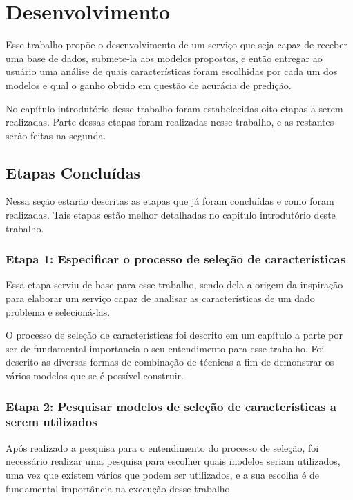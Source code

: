 \chapter[Desenvolvimento]{Desenvolvimento}

Esse trabalho propõe o desenvolvimento de um serviço que seja capaz de receber uma base de dados, submete-la aos modelos propostos, e então entregar ao usuário uma análise de quais características foram escolhidas por cada um dos modelos e qual o ganho obtido em questão de acurácia de predição.

No capítulo introdutório desse trabalho foram estabelecidas oito etapas a serem realizadas. Parte dessas etapas foram realizadas nesse trabalho, e as restantes serão feitas na segunda.

\section{Etapas Concluídas}

Nessa seção estarão descritas as etapas que já foram concluídas e como foram realizadas. Tais etapas estão melhor detalhadas no capítulo introdutório deste trabalho.

\subsection{Etapa 1: Especificar o processo de seleção de características}

Essa etapa serviu de base para esse trabalho, sendo dela a origem da inspiração para elaborar um serviço capaz de analisar as características de um dado problema e selecioná-las. 

O processo de seleção de características foi descrito em um capítulo a parte por ser de fundamental importancia o seu entendimento para esse trabalho. Foi descrito as diversas formas de combinação de técnicas a fim de demonstrar os vários modelos que se é possível construir.

\subsection{Etapa 2: Pesquisar modelos de seleção de características a serem utilizados}

Após realizado a pesquisa para o entendimento do processo de seleção, foi necessário realizar uma pesquisa para escolher quais modelos seriam utilizados, uma vez que existem vários que podem ser utilizados, e a sua escolha é de fundamental importância na execução desse trabalho.

